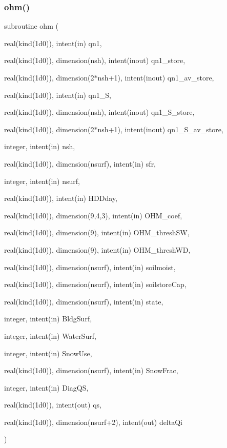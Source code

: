 \subsubsection{\texorpdfstring{ohm()}{ohm()}}
{\footnotesize\ttfamily subroutine ohm (\begin{DoxyParamCaption}\item[{real(kind(1d0)), intent(in)}]{qn1,  }\item[{real(kind(1d0)), dimension(nsh), intent(inout)}]{qn1\+\_\+store,  }\item[{real(kind(1d0)), dimension(2$\ast$nsh+1), intent(inout)}]{qn1\+\_\+av\+\_\+store,  }\item[{real(kind(1d0)), intent(in)}]{qn1\+\_\+S,  }\item[{real(kind(1d0)), dimension(nsh), intent(inout)}]{qn1\+\_\+\+S\+\_\+store,  }\item[{real(kind(1d0)), dimension(2$\ast$nsh+1), intent(inout)}]{qn1\+\_\+\+S\+\_\+av\+\_\+store,  }\item[{integer, intent(in)}]{nsh,  }\item[{real(kind(1d0)), dimension(nsurf), intent(in)}]{sfr,  }\item[{integer, intent(in)}]{nsurf,  }\item[{real(kind(1d0)), intent(in)}]{H\+D\+Dday,  }\item[{real(kind(1d0)), dimension(9,4,3), intent(in)}]{O\+H\+M\+\_\+coef,  }\item[{real(kind(1d0)), dimension(9), intent(in)}]{O\+H\+M\+\_\+thresh\+SW,  }\item[{real(kind(1d0)), dimension(9), intent(in)}]{O\+H\+M\+\_\+thresh\+WD,  }\item[{real(kind(1d0)), dimension(nsurf), intent(in)}]{soilmoist,  }\item[{real(kind(1d0)), dimension(nsurf), intent(in)}]{soilstore\+Cap,  }\item[{real(kind(1d0)), dimension(nsurf), intent(in)}]{state,  }\item[{integer, intent(in)}]{Bldg\+Surf,  }\item[{integer, intent(in)}]{Water\+Surf,  }\item[{integer, intent(in)}]{Snow\+Use,  }\item[{real(kind(1d0)), dimension(nsurf), intent(in)}]{Snow\+Frac,  }\item[{integer, intent(in)}]{Diag\+QS,  }\item[{real(kind(1d0)), intent(out)}]{qs,  }\item[{real(kind(1d0)), dimension(nsurf+2), intent(out)}]{delta\+Qi }\end{DoxyParamCaption})}



